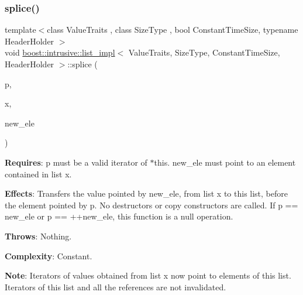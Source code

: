 \subsubsection{\texorpdfstring{splice()}{splice()}\hspace{0.1cm}{\footnotesize\ttfamily [2/4]}}
{\footnotesize\ttfamily template$<$class Value\+Traits , class Size\+Type , bool Constant\+Time\+Size, typename Header\+Holder $>$ \\
void \hyperlink{classboost_1_1intrusive_1_1list__impl}{boost\+::intrusive\+::list\+\_\+impl}$<$ Value\+Traits, Size\+Type, Constant\+Time\+Size, Header\+Holder $>$\+::splice (\begin{DoxyParamCaption}\item[{const\+\_\+iterator}]{p,  }\item[{\hyperlink{classboost_1_1intrusive_1_1list__impl}{list\+\_\+impl}$<$ Value\+Traits, Size\+Type, Constant\+Time\+Size, Header\+Holder $>$ \&}]{x,  }\item[{const\+\_\+iterator}]{new\+\_\+ele }\end{DoxyParamCaption})\hspace{0.3cm}{\ttfamily [inline]}}

{\bfseries Requires}\+: p must be a valid iterator of $\ast$this. new\+\_\+ele must point to an element contained in list x.

{\bfseries Effects}\+: Transfers the value pointed by new\+\_\+ele, from list x to this list, before the element pointed by p. No destructors or copy constructors are called. If p == new\+\_\+ele or p == ++new\+\_\+ele, this function is a null operation.

{\bfseries Throws}\+: Nothing.

{\bfseries Complexity}\+: Constant.

{\bfseries Note}\+: Iterators of values obtained from list x now point to elements of this list. Iterators of this list and all the references are not invalidated. \mbox{\label{classboost_1_1intrusive_1_1list__impl_aca408f75788b574272d29392aebef9a5}} 
